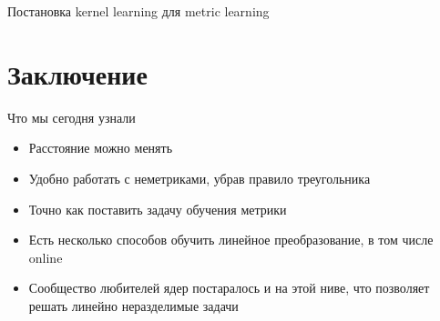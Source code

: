 \documentclass[14pt, fleqn, xcolor={dvipsnames, table}]{beamer}
\begin{document}
\begin{frame}{Постановка kernel learning для metric learning}
\end{frame}

\section{Заключение}
\begin{frame}{Что мы сегодня узнали}
\begin{itemize}
  \item Расстояние можно менять
  \item Удобно работать с неметриками, убрав правило треугольника
  \item Точно как поставить задачу обучения метрики
  \item Есть несколько способов обучить линейное преобразование, в том числе online
  \item Сообщество любителей ядер постаралось и на этой ниве, что позволяет решать линейно неразделимые задачи
\end{itemize}
\end{frame}
\end{document}
